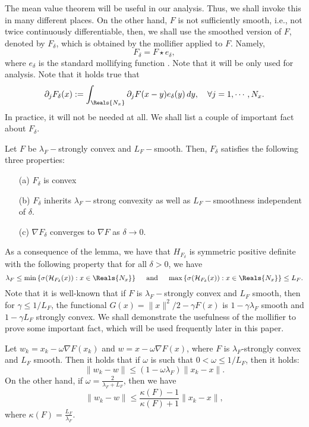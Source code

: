 The mean value theorem will be useful in our analysis. Thus, we shall invoke this in many different places. On the other hand, $F$ is not sufficiently smooth, i.e., not twice continuously differentiable, then, we shall use the smoothed version of $F$, denoted by $F_\delta$, which is obtained by the mollifier applied to $F$. Namely,  
\begin{equation}
F_\delta = F \star e_\delta,  
\end{equation}
where $e_\delta$ is the standard mollifying function \cite{ghomi2002problem}. Note that it will be only used for analysis. Note that it holds true that \begin{equation}
\partial_j F_\delta(x) := \int_{\Reals{N_x}} \partial_j F(x - y) e_\delta(y) \, dy, \quad \forall j = 1,\cdots,N_x. 
\end{equation}
In practice, it will not be needed at all. We shall list a couple of important fact about $F_\delta$. 
\begin{lemma}
Let $F$ be $\lambda_F-$strongly convex and $L_F-$smooth. Then, $F_\delta$ satisfies the following three properties: 
\begin{enumerate} 
\item[(a)] $F_\delta$ is convex 
\item[(b)] $F_\delta$ inherits $\lambda_F-$strong convexity as well as $L_F-$smoothness independent of $\delta$. 
\item[(c)] $\nabla F_\delta$ converges to $\nabla F$ as $\delta \rightarrow 0$. 
\end{enumerate}
\end{lemma} 
As a consequence of the lemma, we have that $H_{F_\delta}$ is symmetric positive definite with the following property that for all $\delta > 0$, we have 
\begin{equation}\label{hessian} 
\lambda_F \leq \min \left \{ \sigma (\mathcal{H}_{F_\delta}(x)) : x \in \Reals{N_x} \right \}
\quad \mbox{ and } \quad \max \left \{ \sigma(\mathcal{H}_{F_\delta}(x)) : x \in \Reals{N_x} \right \} \leq L_F.
\end{equation} 
Note that it is well-known that if $F$ is $\lambda_F-$strongly convex and $L_F$ smooth, then for $\gamma \leq 1/L_F$, the functional $G(x) = \|x\|^2/2 - \gamma F(x)$ is $1 - \gamma \lambda_F$ smooth and $1 - \gamma L_F$ strongly convex. We shall demonstrate the usefulness of the mollifier to prove some important fact, which will be used frequently later in this paper. 
\begin{lemma}\label{lemmaGD}
Let $w_k = x_k - \omega \nabla F(x_k)$ and $w = x - \omega \nabla F (x)$, where $F$ is $\lambda_F$-strongly convex and $L_F$ smooth. Then it holds that if $\omega$ is such that $0 < \omega \leq 1/L_F$, then it holds:  
\begin{equation}
\|w_k - w\| \leq (1 - \omega \lambda_F) \|x_k - x\|.  
\end{equation}
On the other hand, if $\omega = \frac{2}{\lambda_F + L_F}$, then we have  
\begin{equation}
\|w_k - w\| \leq \frac{\kappa(F) - 1}{\kappa(F) + 1} \|x_k - x\|,  
\end{equation}
where $\kappa(F) = \frac{L_F}{\lambda_F}$. 
\end{lemma}
